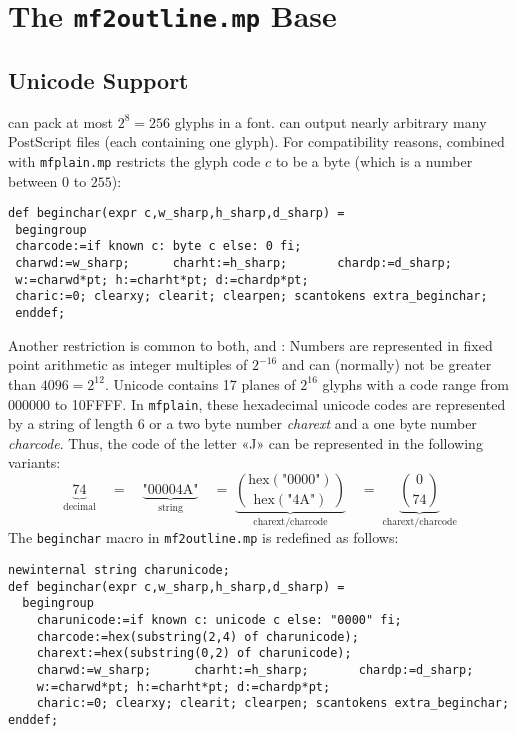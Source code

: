 \documentclass{scrartcl}
\begin{document}
\section{The \texttt{mf2outline.mp} Base}
%
\subsection{Unicode Support}
%
\MF{} can pack at most $2^{8}=256$ glyphs in a font. \MP{} can output nearly arbitrary many PostScript files (each containing one glyph). For compatibility reasons, \MP{} combined with \texttt{mfplain.mp} restricts the glyph code $c$ to be a byte (which is a number between $0$ to $255$):
\lstset{language=MetaPost,columns=fullflexible}
\begin{lstlisting}
def beginchar(expr c,w_sharp,h_sharp,d_sharp) =
 begingroup
 charcode:=if known c: byte c else: 0 fi;
 charwd:=w_sharp;      charht:=h_sharp;       chardp:=d_sharp;
 w:=charwd*pt; h:=charht*pt; d:=chardp*pt;
 charic:=0; clearxy; clearit; clearpen; scantokens extra_beginchar;
 enddef;
\end{lstlisting}
%
Another restriction is common to both, \MF{} and \MP: Numbers are represented in fixed point arithmetic as integer multiples of $2^{-16}$ and can (normally) not be greater than $4096=2^{12}$. Unicode contains 17 planes of $2^{16}$ glyphs with a code range from 000000 to 10FFFF. In \texttt{mfplain}, these hexadecimal unicode codes are represented by a string of length $6$ or a two byte number \emph{charext} and a one byte number \emph{charcode}. Thus, the code of the letter «J» can be represented in the following variants:
\[
	\underbrace{74}_{\text{decimal}}\quad=\quad\underbrace{\text{"00004A"}}_{\text{string}}\quad=\;\underbrace{\binom{\mathrm{hex}(\text{"0000"})}{\mathrm{hex}(\text{"4A"})}}_{\text{charext/charcode}}\quad=\;\underbrace{\binom{0}{74}}_{\text{charext/charcode}}
\]
The \texttt{beginchar} macro in \texttt{mf2outline.mp} is redefined as follows:
\lstset{language=MetaPost,columns=fullflexible}
\begin{lstlisting}
newinternal string charunicode;
def beginchar(expr c,w_sharp,h_sharp,d_sharp) =
  begingroup
    charunicode:=if known c: unicode c else: "0000" fi; 
    charcode:=hex(substring(2,4) of charunicode); 
    charext:=hex(substring(0,2) of charunicode); 
    charwd:=w_sharp;      charht:=h_sharp;       chardp:=d_sharp;
    w:=charwd*pt; h:=charht*pt; d:=chardp*pt;
    charic:=0; clearxy; clearit; clearpen; scantokens extra_beginchar;
enddef;
\end{lstlisting}
\end{document}
